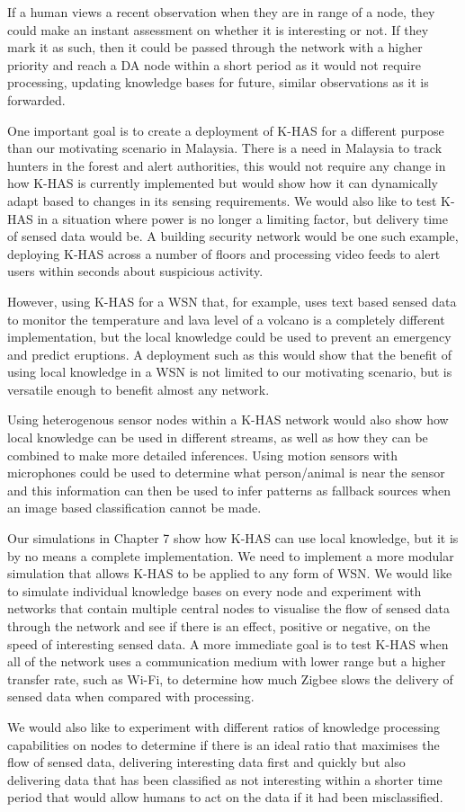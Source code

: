 If a human views a recent observation when they are in range of a node, they could make an instant assessment on whether it is interesting or not. If they mark it as such, then it could be passed through the network with a higher priority and reach a DA node within a short period as it would not require processing, updating knowledge bases for future, similar observations as it is forwarded.

One important goal is to create a deployment of K-HAS for a different purpose than our motivating scenario in Malaysia. There is a need in Malaysia to track hunters in the forest and alert authorities, this would not require any change in how K-HAS is currently implemented but would show how it can dynamically adapt based to changes in its sensing requirements. We would also like to test K-HAS in a situation where power is no longer a limiting factor, but delivery time of sensed data would be. A building security network would be one such example, deploying K-HAS across a number of floors and processing video feeds to alert users within seconds about suspicious activity.

However, using K-HAS for a WSN that, for example, uses text based sensed data to monitor the temperature and lava level of a volcano is a completely different implementation, but the local knowledge could be used to prevent an emergency and predict eruptions. A deployment such as this would show that the benefit of using local knowledge in a WSN is not limited to our motivating scenario, but is versatile enough to benefit almost any network.

Using heterogenous sensor nodes within a K-HAS network would also show how local knowledge can be used in different streams, as well as how they can be combined to make more detailed inferences.  Using motion sensors with microphones could be used to determine what person/animal is near the sensor and this information can then be used to infer patterns as fallback sources when an image based classification cannot be made.

Our simulations in Chapter 7 show how K-HAS can use local knowledge, but it is by no means a complete implementation.  We need to implement a more modular simulation that allows K-HAS to be applied to any form of WSN. We would like to simulate individual knowledge bases on every node and experiment with networks that contain multiple central nodes to visualise the flow of sensed data through the network and see if there is an effect, positive or negative, on the speed of interesting sensed data. A more immediate goal is to test K-HAS when all of the network uses a communication medium with lower range but a higher transfer rate, such as Wi-Fi, to determine how much Zigbee slows the delivery of sensed data when compared with processing.

We would also like to experiment with different ratios of knowledge processing capabilities on nodes to determine if there is an ideal ratio that maximises the flow of sensed data, delivering interesting data first and quickly but also delivering data that has been classified as not interesting within a shorter time period that would allow humans to act on the data if it had been misclassified.
